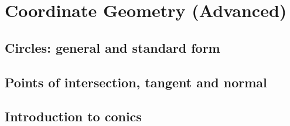 
\section{Coordinate Geometry (Advanced)}

\subsection{Circles: general and standard form}


\subsection{Points of intersection, tangent and normal}


\subsection{Introduction to conics}

